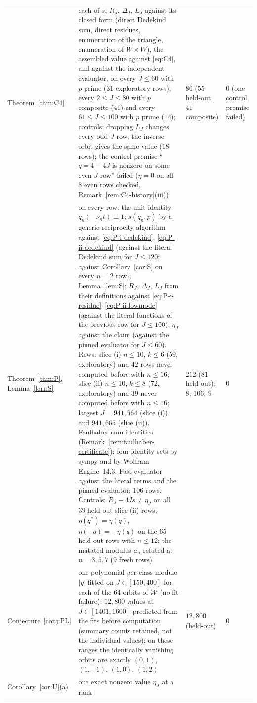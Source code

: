 \documentclass[11pt]{article}
\theoremstyle{definition}
\begin{document}
\begin{small}
\begin{longtable}{@{}L{0.24\textwidth}L{0.41\textwidth}L{0.2\textwidth}L{0.07\textwidth}@{}}
Theorem~\ref{thm:C4} & each of $s$, $R_J$, $\Delta_J$, $L_J$ against its
closed form (direct Dedekind sum, direct residues, enumeration of the
triangle, enumeration of $W\times W$), the assembled value against
\eqref{eq:C4}, and against the independent evaluator, on every $J\leq60$
with $p$ prime ($31$ exploratory rows), every $2\leq J\leq80$ with $p$
composite ($41$) and every $61\leq J\leq100$ with $p$ prime ($14$);
controls: dropping $L_J$ changes every odd-$J$ row; the inverse orbit
gives the same value ($18$ rows); the control premise ``$q=4-4J$ is
nonzero on some even-$J$ row'' failed ($\eta=0$ on all $8$ even rows
checked, Remark~\ref{rem:C4-history}(iii)) & $86$ ($55$ held-out, $41$
composite) & $0$ (one control premise failed)\\
Theorem~\ref{thm:P}, Lemma~\ref{lem:S} & on every row: the unit identity
$q_n(-\nu_nt)\equiv1$; $s(q_n,p)$ by a generic reciprocity algorithm
against \eqref{eq:P-i-dedekind}, \eqref{eq:P-ii-dedekind} (against the
literal Dedekind sum for $J\leq120$; against Corollary~\ref{cor:S} on
every $n=2$ row); Lemma~\ref{lem:S}; $R_J$, $\Delta_J$, $L_J$ from their
definitions against \eqref{eq:P-i-residue}--\eqref{eq:P-ii-lowmode}
(against the literal functions of the previous row for $J\leq100$);
$\eta_J$ against the claim (against the pinned evaluator for $J\leq60$).
Rows: slice (i) $n\leq10$, $k\leq6$ ($59$, exploratory) and $42$ rows never
computed before with $n\leq16$; slice (ii) $n\leq10$, $k\leq8$ ($72$,
exploratory) and $39$ never computed before with $n\leq16$; largest
$J=941{,}664$ (slice (i)) and $941{,}665$ (slice (ii)).  Faulhaber-sum
identities (Remark~\ref{rem:faulhaber-certificate}): four identity sets
by sympy and by Wolfram Engine~14.3.  Fast evaluator against the literal
terms and the pinned evaluator: $106$ rows.  Controls: $R_J-4Js\neq\eta_J$
on all $39$ held-out slice-(ii) rows; $\eta(q^*)=\eta(q)$,
$\eta(-q)=-\eta(q)$ on the $65$ held-out rows with $n\leq12$; the mutated
modulus $a_n$ refuted at $n=3,5,7$ ($9$ fresh rows) & $212$ ($81$
held-out); $8$; $106$; $9$ & $0$\\
Conjecture~\ref{conj:PL} & one polynomial per class modulo $|y|$ fitted
on $J\in[150,400]$ for each of the $64$ orbits of $\mathcal W$ (no fit
failure); $12{,}800$ values at $J\in[1401,1600]$ predicted from the fits
before computation (summary counts retained, not the individual
values); on these ranges the identically vanishing orbits are exactly
$(0,1)$, $(1,-1)$, $(1,0)$, $(1,2)$ & $12{,}800$ (held-out) & $0$\\
Corollary~\ref{cor:U}(a) & one exact nonzero value $\eta_J$ at a rank

\end{longtable}
\end{small}
\end{document}
